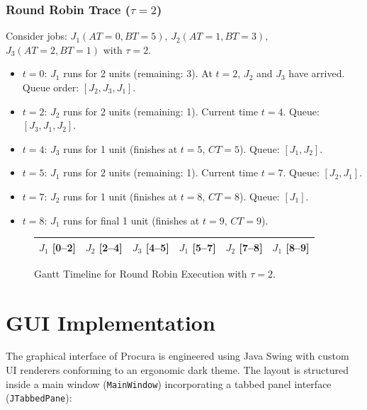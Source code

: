 \documentclass[12pt,a4paper]{article}
\begin{document}
\subsubsection{Round Robin Trace ($\tau = 2$)}
Consider jobs: $J_1(AT=0, BT=5)$, $J_2(AT=1, BT=3)$, $J_3(AT=2, BT=1)$ with $\tau = 2$.
\begin{itemize}
    \item $t=0$: $J_1$ runs for 2 units (remaining: 3). At $t=2$, $J_2$ and $J_3$ have arrived. Queue order: $[J_2, J_3, J_1]$.
    \item $t=2$: $J_2$ runs for 2 units (remaining: 1). Current time $t=4$. Queue: $[J_3, J_1, J_2]$.
    \item $t=4$: $J_3$ runs for 1 unit (finishes at $t=5$, $CT=5$). Queue: $[J_1, J_2]$.
    \item $t=5$: $J_1$ runs for 2 units (remaining: 1). Current time $t=7$. Queue: $[J_2, J_1]$.
    \item $t=7$: $J_2$ runs for 1 unit (finishes at $t=8$, $CT=8$). Queue: $[J_1]$.
    \item $t=8$: $J_1$ runs for final 1 unit (finishes at $t=9$, $CT=9$).
\end{itemize}

\begin{figure}[H]
\centering
\begin{tabular}{|c|c|c|c|c|c|}
\hline
\textbf{$J_1$ [0--2]} & \textbf{$J_2$ [2--4]} & \textbf{$J_3$ [4--5]} & \textbf{$J_1$ [5--7]} & \textbf{$J_2$ [7--8]} & \textbf{$J_1$ [8--9]} \\
\hline
\end{tabular}
\caption{Gantt Timeline for Round Robin Execution with $\tau = 2$.}
\end{figure}

\section{GUI Implementation}
The graphical interface of Procura is engineered using Java Swing with custom UI renderers conforming to an ergonomic dark theme. The layout is structured inside a main window (\texttt{MainWindow}) incorporating a tabbed panel interface (\texttt{JTabbedPane}):
\end{document}
